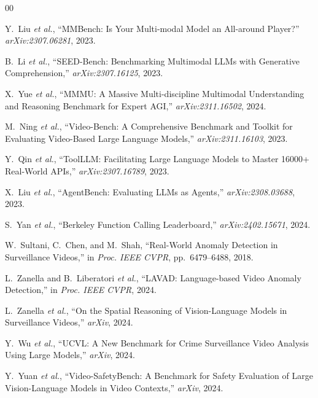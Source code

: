 \documentclass[onecolumn,10pt]{IEEEtran}
\begin{document}
\begin{thebibliography}{00}

Y.~Liu \textit{et al.}, ``MMBench: Is Your Multi-modal Model an
All-around Player?'' \textit{arXiv:2307.06281}, 2023.

B.~Li \textit{et al.}, ``SEED-Bench: Benchmarking Multimodal LLMs with
Generative Comprehension,'' \textit{arXiv:2307.16125}, 2023.

X.~Yue \textit{et al.}, ``MMMU: A Massive Multi-discipline Multimodal
Understanding and Reasoning Benchmark for Expert AGI,''
\textit{arXiv:2311.16502}, 2024.

M.~Ning \textit{et al.}, ``Video-Bench: A Comprehensive Benchmark and
Toolkit for Evaluating Video-Based Large Language Models,''
\textit{arXiv:2311.16103}, 2023.

Y.~Qin \textit{et al.}, ``ToolLLM: Facilitating Large Language Models
to Master 16000+ Real-World APIs,'' \textit{arXiv:2307.16789}, 2023.

X.~Liu \textit{et al.}, ``AgentBench: Evaluating LLMs as Agents,''
\textit{arXiv:2308.03688}, 2023.

S.~Yan \textit{et al.}, ``Berkeley Function Calling Leaderboard,''
\textit{arXiv:2402.15671}, 2024.

W.~Sultani, C.~Chen, and M.~Shah, ``Real-World Anomaly Detection in
Surveillance Videos,'' in \textit{Proc. IEEE CVPR}, pp.~6479--6488, 2018.

L.~Zanella and B.~Liberatori \textit{et al.}, ``LAVAD: Language-based
Video Anomaly Detection,'' in \textit{Proc. IEEE CVPR}, 2024.

L.~Zanella \textit{et al.}, ``On the Spatial Reasoning of
Vision-Language Models in Surveillance Videos,'' \textit{arXiv}, 2024.

Y.~Wu \textit{et al.}, ``UCVL: A New Benchmark for Crime Surveillance
Video Analysis Using Large Models,'' \textit{arXiv}, 2024.

Y.~Yuan \textit{et al.}, ``Video-SafetyBench: A Benchmark for Safety
Evaluation of Large Vision-Language Models in Video Contexts,''
\textit{arXiv}, 2024.


\end{thebibliography}
\end{document}
